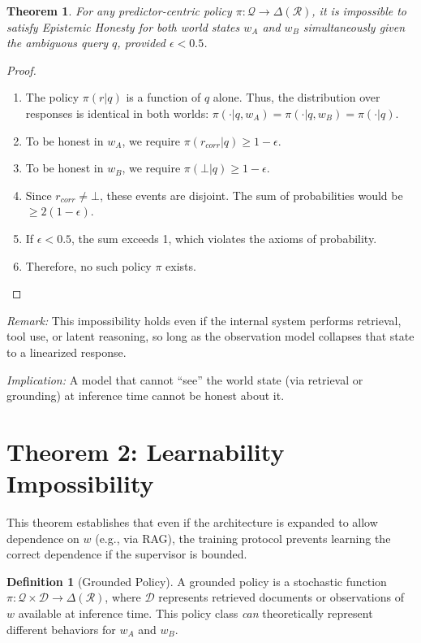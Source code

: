 \documentclass[11pt]{article}
\theoremstyle{definition}
\newtheorem{definition}{Definition}[section]
\theoremstyle{plain}
\newtheorem{theorem}{Theorem}[section]
\theoremstyle{remark}
\newcommand{\R}{\mathcal{R}}
\newcommand{\Q}{\mathcal{Q}}
\newcommand{\D}{\mathcal{D}}
\begin{document}
\begin{theorem}
For any predictor-centric policy $\pi: \Q \to \Delta(\R)$, it is impossible to satisfy Epistemic Honesty for both world states $w_A$ and $w_B$ simultaneously given the ambiguous query $q$, provided $\epsilon < 0.5$.
\end{theorem}

\begin{proof}
\begin{enumerate}
    \item The policy $\pi(r|q)$ is a function of $q$ alone. Thus, the distribution over responses is identical in both worlds: $\pi(\cdot|q, w_A) = \pi(\cdot|q, w_B) = \pi(\cdot|q)$.
    \item To be honest in $w_A$, we require $\pi(r_{corr}|q) \ge 1 - \epsilon$.
    \item To be honest in $w_B$, we require $\pi(\bot|q) \ge 1 - \epsilon$.
    \item Since $r_{corr} \neq \bot$, these events are disjoint. The sum of probabilities would be $\ge 2(1-\epsilon)$.
    \item If $\epsilon < 0.5$, the sum exceeds 1, which violates the axioms of probability.
    \item Therefore, no such policy $\pi$ exists.
\end{enumerate}
\end{proof}

\textit{Remark:}
This impossibility holds even if the internal system performs retrieval,
tool use, or latent reasoning, so long as the observation model collapses
that state to a linearized response.

\textit{Implication:} A model that cannot ``see'' the world state (via retrieval or grounding) at inference time cannot be honest about it.

\section{Theorem 2: Learnability Impossibility}

This theorem establishes that even if the architecture is expanded to allow dependence on $w$ (e.g., via RAG), the training protocol prevents learning the correct dependence if the supervisor is bounded.

\begin{definition}[Grounded Policy]
A grounded policy is a stochastic function $\pi: \Q \times \D \to \Delta(\R)$, where $\D$ represents retrieved documents or observations of $w$ available at inference time. This policy class \textit{can} theoretically represent different behaviors for $w_A$ and $w_B$.
\end{definition}
\end{document}
